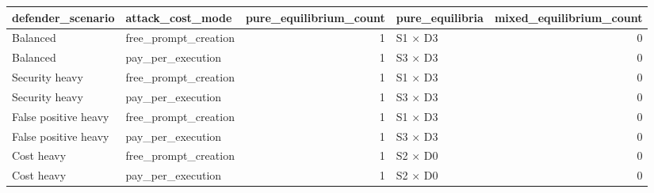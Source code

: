 \begin{tabular}{llrlr}
\toprule
defender\_scenario & attack\_cost\_mode & pure\_equilibrium\_count & pure\_equilibria & mixed\_equilibrium\_count \\
\midrule
Balanced & free\_prompt\_creation & 1 & S1 × D3 & 0 \\
Balanced & pay\_per\_execution & 1 & S3 × D3 & 0 \\
Security heavy & free\_prompt\_creation & 1 & S1 × D3 & 0 \\
Security heavy & pay\_per\_execution & 1 & S3 × D3 & 0 \\
False positive heavy & free\_prompt\_creation & 1 & S1 × D3 & 0 \\
False positive heavy & pay\_per\_execution & 1 & S3 × D3 & 0 \\
Cost heavy & free\_prompt\_creation & 1 & S2 × D0 & 0 \\
Cost heavy & pay\_per\_execution & 1 & S2 × D0 & 0 \\
\bottomrule
\end{tabular}
